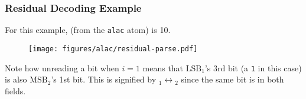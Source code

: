 \begin{landscape}
\subsubsection{Residual Decoding Example}
For this example,  (from the \texttt{alac} atom) is 10.
\par
\begin{figure}[h]
\texttt{[image: figures/alac/residual-parse.pdf]}
\end{figure}
\par
\noindent
Note how unreading a bit when $i = 1$ means that $\text{LSB}_1$'s 3rd bit
(a \texttt{1} in this case) is also $\text{MSB}_2$'s 1st bit.
This is signified by $\text{}_1 \leftrightarrow \text{}_2$
since the same bit is in both fields.

\clearpage


\end{landscape}
